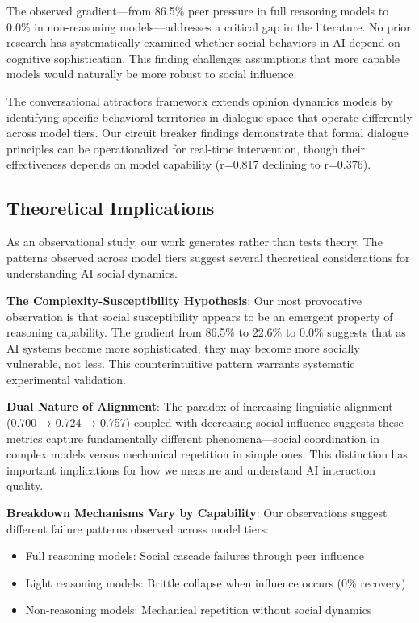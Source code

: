 \documentclass[11pt,letterpaper]{article}
\newcommand{\exponedataPeerPressurePercentage}{86.5\%}
\newcommand{\exponedataQuestionCorrelation}{0.817}
\newcommand{\exptwoPeerPressurePercentage}{22.6\%}
\newcommand{\expthreePeerPressurePercentage}{0.0\%}
\newcommand{\expthreeQuestionCorrelation}{0.376}
\begin{document}
The observed gradient—from \exponedataPeerPressurePercentage{} peer pressure in full reasoning models to \expthreePeerPressurePercentage{} in non-reasoning models—addresses a critical gap in the literature. No prior research has systematically examined whether social behaviors in AI depend on cognitive sophistication. This finding challenges assumptions that more capable models would naturally be more robust to social influence.

The conversational attractors framework extends opinion dynamics models \citep{hegselmann2002opinion} by identifying specific behavioral territories in dialogue space that operate differently across model tiers. Our circuit breaker findings demonstrate that formal dialogue principles \citep{mcburney2002dialogue} can be operationalized for real-time intervention, though their effectiveness depends on model capability (r=\exponedataQuestionCorrelation{} declining to r=\expthreeQuestionCorrelation{}).

\subsection{Theoretical Implications}

As an observational study, our work generates rather than tests theory. The patterns observed across model tiers suggest several theoretical considerations for understanding AI social dynamics.

\textbf{The Complexity-Susceptibility Hypothesis}: Our most provocative observation is that social susceptibility appears to be an emergent property of reasoning capability. The gradient from \exponedataPeerPressurePercentage{} to \exptwoPeerPressurePercentage{} to \expthreePeerPressurePercentage{} suggests that as AI systems become more sophisticated, they may become more socially vulnerable, not less. This counterintuitive pattern warrants systematic experimental validation.

\textbf{Dual Nature of Alignment}: The paradox of increasing linguistic alignment (0.700 → 0.724 → 0.757) coupled with decreasing social influence suggests these metrics capture fundamentally different phenomena—social coordination in complex models versus mechanical repetition in simple ones. This distinction has important implications for how we measure and understand AI interaction quality.

\textbf{Breakdown Mechanisms Vary by Capability}: Our observations suggest different failure patterns observed across model tiers:
\begin{itemize}
    \item Full reasoning models: Social cascade failures through peer influence
    \item Light reasoning models: Brittle collapse when influence occurs (0\% recovery)
    \item Non-reasoning models: Mechanical repetition without social dynamics
\end{itemize}
\end{document}

